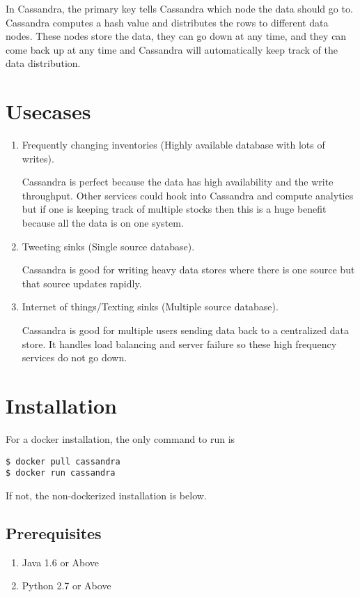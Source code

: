 \documentclass[9pt,twocolumn,twoside]{idsi}
\begin{document}
In Cassandra, the primary key tells Cassandra which node the data should go to. Cassandra computes a hash value and distributes the rows to different data nodes. These nodes store the data, they can go down at any time, and they can come back up at any time and Cassandra will automatically keep track of the data distribution.
\section{Usecases}

\begin{enumerate}

\item Frequently changing inventories (Highly available database with lots of writes).

Cassandra is perfect because the data has high availability and the write throughput. Other services could hook into Cassandra and compute analytics but if one is keeping track of multiple stocks then this is a huge benefit because all the data is on one system.

\item Tweeting sinks (Single source database). 

Cassandra is good for writing heavy data stores where there is one source but that source updates rapidly.

\item Internet of things/Texting sinks (Multiple source database). 

Cassandra is good for multiple users sending data back to a centralized data store. It handles load balancing and server failure so these high frequency services do not go down.

\end{enumerate}

\section{Installation}

For a docker installation, the only command to run is

\begin{lstlisting}[breaklines]
$ docker pull cassandra
$ docker run cassandra
\end{lstlisting}

If not, the non-dockerized installation is below.

\subsection{Prerequisites}
\begin{enumerate}
  \item Java 1.6 or Above
  \item Python 2.7 or Above
\end{enumerate}
\end{document}
